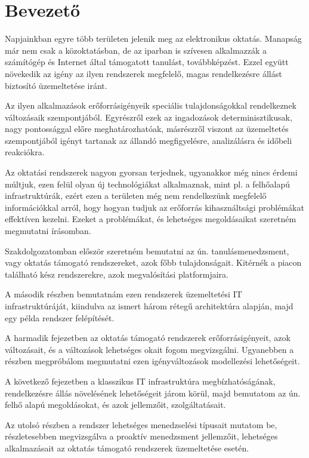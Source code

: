 \chapter*{Bevezető}

Napjainkban egyre több területen jelenik meg az elektronikus oktatás. Manapság már nem csak a közoktatásban, de az iparban is szívesen alkalmazzák a számítógép és Internet által támogatott tanulást, továbbképzést. Ezzel együtt növekedik az igény az ilyen rendszerek megfelelő, magas rendelkezésre állást biztosító üzemeltetése iránt.

Az ilyen alkalmazások erőforrásigényeik speciális tulajdonságokkal rendelkeznek változásaik szempontjából. Egyrészről ezek az ingadozások determinisztikusak, nagy pontossággal előre meghatározhatóak, másrészről viszont az üzemeltetés szempontjából igényt tartanak az állandó megfigyelésre, analizálásra és időbeli reakciókra.

Az oktatási rendszerek nagyon gyorsan terjednek, ugyanakkor még nincs érdemi múltjuk, ezen felül olyan új technológiákat alkalmaznak, mint pl. a felhőalapú infrastruktúrák, ezért ezen a területen még nem rendelkezünk megfelelő információkkal arról, hogy hogyan tudjuk az erőforrás kihasználtsági problémákat effektíven kezelni. Ezeket a problémákat, és lehetséges megoldásaikat szeretném megmutatni írásomban.

Szakdolgozatomban először szeretném bemutatni az ún. tanulásmenedzsment, vagy oktatás támogató rendszereket, azok főbb tulajdonságait. Kitérnék a piacon található kész rendszerekre, azok megvalósítási platformjaira.

A második részben bemutatnám ezen rendszerek üzemeltetési IT infrastruktúráját, kiindulva az ismert három rétegű architektúra alapján, majd egy példa rendszer felépítését.

A harmadik fejezetben az oktatás támogató rendszerek erőforrásigényeit, azok változásait, és a változások lehetséges okait fogom megvizsgálni. Ugyanebben a részben megpróbálom megmutatni ezen igényváltozások modellezési lehetőségeit.

A következő fejezetben a klasszikus IT infrastruktúra megbízhatóságának, rendelkezésre állás növelésének lehetőségeit járom körül, majd bemutatom az ún. felhő alapú megoldásokat, és azok jellemzőit, szolgáltatásait.

Az utolsó részben a rendszer lehetséges menedzselési típusait mutatom be, részletesebben megvizsgálva a proaktív menedzsment jellemzőit, lehetséges alkalmazásait az oktatás támogató rendszerek üzemeltetése esetén.
 